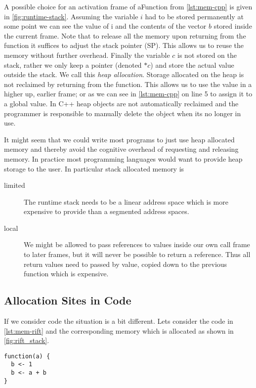 A possible choice for an activation frame of aFunction from \autoref{lst:mem-cpp} is given in \autoref{fig:runtime-stack}. Assuming the variable $i$ had to be stored permanently at some point we can see the value of i and the contents of the vector $b$ stored inside the current frame. Note that to release all the memory upon returning from the function it suffices to adjust the stack pointer (SP). This allows us to reuse the memory without further overhead. Finally the variable $c$ is not stored on the stack, rather we only keep a pointer (denoted $*c$) and store the actual value outside the stack. We call this \emph{heap allocation}. Storage allocated on the heap is not reclaimed by returning from the function. This allows us to use the value in a higher up, \ie earlier frame; or as we can see in \autoref{lst:mem-cpp} on line 5 to assign it to a global value. In C++ heap objects are not automatically reclaimed and the programmer is responsible to manually delete the object when its no longer in use.

It might seem that we could write most programs to just use heap allocated memory and thereby avoid the cognitive overhead of requesting and releasing memory. In practice most programming languages would want to provide heap storage to the user. In particular stack allocated memory is

\begin{description}
  \item[limited] The runtime stack needs to be a linear address space which is more expensive to provide than a segmented address spaces.
  \item[local] We might be allowed to pass references to values inside our own call frame to later frames, but it will never be possible to return a reference. Thus all return values need to passed by value, \ie copied down to the previous function which is expensive.
\end{description}

\subsection{Allocation Sites in \rift Code}

If we consider \rift code the situation is a bit different. Lets consider the code in \autoref{lst:mem-rift} and the corresponding memory which is allocated as shown in \autoref{fig:rift_stack}.

\begin{lstlisting}[language=rift, caption={Some values allocated in \rift.}, label={lst:mem-rift}]
function(a) {
  b <- 1
  b <- a + b
}
\end{lstlisting}

